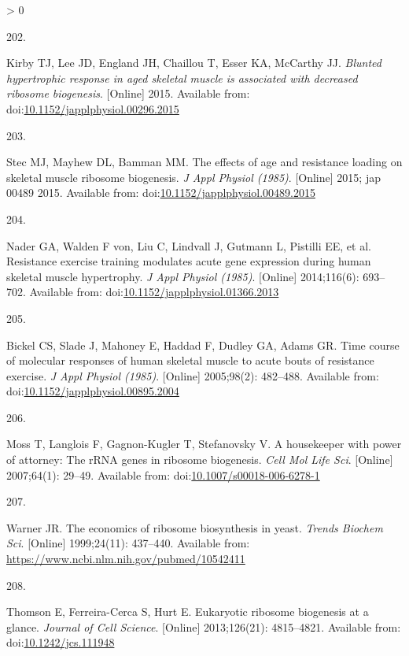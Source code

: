 \documentclass[twoside,10pt]{gihclass} %
\newlength{\cslhangindent}
\newlength{\csllabelwidth}
\newenvironment{CSLReferences}[3] %
 {%
  \setlength{\parindent}{0pt}
  \ifodd #1 \everypar{\setlength{\hangindent}{\cslhangindent}}\ignorespaces\fi
  \ifnum #2 > 0
  \setlength{\parskip}{#2\baselineskip}
  \fi
 }%
 {}
\newcommand{\CSLLeftMargin}[1]{\parbox[t]{\maxof{\widthof{#1}}{\csllabelwidth}}{#1}}
\newcommand{\CSLRightInline}[1]{\parbox[t]{\linewidth}{#1}}
\begin{document}
\begin{CSLReferences}{0}{0}
\leavevmode\hypertarget{ref-RN1631}{}%
\CSLLeftMargin{202. }
\CSLRightInline{Kirby TJ, Lee JD, England JH, Chaillou T, Esser KA, McCarthy JJ. \emph{Blunted hypertrophic response in aged skeletal muscle is associated with decreased ribosome biogenesis}. {[}Online{]} 2015. Available from: doi:\href{https://doi.org/10.1152/japplphysiol.00296.2015}{10.1152/japplphysiol.00296.2015}}

\leavevmode\hypertarget{ref-RN1656}{}%
\CSLLeftMargin{203. }
\CSLRightInline{Stec MJ, Mayhew DL, Bamman MM. The effects of age and resistance loading on skeletal muscle ribosome biogenesis. \emph{J Appl Physiol (1985)}. {[}Online{]} 2015; jap 00489 2015. Available from: doi:\href{https://doi.org/10.1152/japplphysiol.00489.2015}{10.1152/japplphysiol.00489.2015}}

\leavevmode\hypertarget{ref-RN1037}{}%
\CSLLeftMargin{204. }
\CSLRightInline{Nader GA, Walden F von, Liu C, Lindvall J, Gutmann L, Pistilli EE, et al. Resistance exercise training modulates acute gene expression during human skeletal muscle hypertrophy. \emph{J Appl Physiol (1985)}. {[}Online{]} 2014;116(6): 693--702. Available from: doi:\href{https://doi.org/10.1152/japplphysiol.01366.2013}{10.1152/japplphysiol.01366.2013}}

\leavevmode\hypertarget{ref-RN1520}{}%
\CSLLeftMargin{205. }
\CSLRightInline{Bickel CS, Slade J, Mahoney E, Haddad F, Dudley GA, Adams GR. Time course of molecular responses of human skeletal muscle to acute bouts of resistance exercise. \emph{J Appl Physiol (1985)}. {[}Online{]} 2005;98(2): 482--488. Available from: doi:\href{https://doi.org/10.1152/japplphysiol.00895.2004}{10.1152/japplphysiol.00895.2004}}

\leavevmode\hypertarget{ref-RN1820}{}%
\CSLLeftMargin{206. }
\CSLRightInline{Moss T, Langlois F, Gagnon-Kugler T, Stefanovsky V. A housekeeper with power of attorney: The rRNA genes in ribosome biogenesis. \emph{Cell Mol Life Sci}. {[}Online{]} 2007;64(1): 29--49. Available from: doi:\href{https://doi.org/10.1007/s00018-006-6278-1}{10.1007/s00018-006-6278-1}}

\leavevmode\hypertarget{ref-RN1920}{}%
\CSLLeftMargin{207. }
\CSLRightInline{Warner JR. The economics of ribosome biosynthesis in yeast. \emph{Trends Biochem Sci}. {[}Online{]} 1999;24(11): 437--440. Available from: \url{https://www.ncbi.nlm.nih.gov/pubmed/10542411}}

\leavevmode\hypertarget{ref-RN1940}{}%
\CSLLeftMargin{208. }
\CSLRightInline{Thomson E, Ferreira-Cerca S, Hurt E. Eukaryotic ribosome biogenesis at a glance. \emph{Journal of Cell Science}. {[}Online{]} 2013;126(21): 4815--4821. Available from: doi:\href{https://doi.org/10.1242/jcs.111948}{10.1242/jcs.111948}}


\end{CSLReferences}
\end{document}
